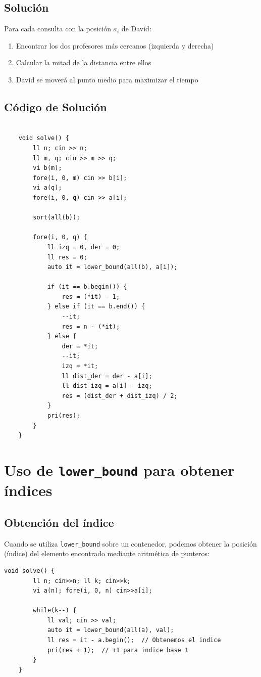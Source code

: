 \subsection{Solución}
Para cada consulta con la posición $a_i$ de David:
\begin{enumerate}
	\item Encontrar los dos profesores más cercanos (izquierda y derecha)
	\item Calcular la mitad de la distancia entre ellos
	\item David se moverá al punto medio para maximizar el tiempo
\end{enumerate}

\subsection{Código de Solución}
\begin{lstlisting}[style=cppstyle, caption={Solución del problema}]

	void solve() {
		ll n; cin >> n;
		ll m, q; cin >> m >> q;
		vi b(m);
		fore(i, 0, m) cin >> b[i];
		vi a(q);
		fore(i, 0, q) cin >> a[i];
		
		sort(all(b));
		
		fore(i, 0, q) {
			ll izq = 0, der = 0;
			ll res = 0;
			auto it = lower_bound(all(b), a[i]);
			
			if (it == b.begin()) {
				res = (*it) - 1;
			} else if (it == b.end()) {
				--it;
				res = n - (*it);
			} else {
				der = *it;
				--it;
				izq = *it;
				ll dist_der = der - a[i];
				ll dist_izq = a[i] - izq;
				res = (dist_der + dist_izq) / 2;
			}
			pri(res);
		}
	}
\end{lstlisting}

\section{Uso de \texttt{lower\_bound} para obtener índices}

\subsection{Obtención del índice}
Cuando se utiliza \texttt{lower\_bound} sobre un contenedor, podemos obtener la posición (índice) del elemento encontrado mediante aritmética de punteros:

\begin{lstlisting}[style=cppstyle, caption={Obtención del índice con lower\_bound}]
	void solve() {
		ll n; cin>>n; ll k; cin>>k;
		vi a(n); fore(i, 0, n) cin>>a[i];
		
		while(k--) {
			ll val; cin >> val;
			auto it = lower_bound(all(a), val);
			ll res = it - a.begin();  // Obtenemos el indice
			pri(res + 1);  // +1 para indice base 1
		}
	}
\end{lstlisting}

